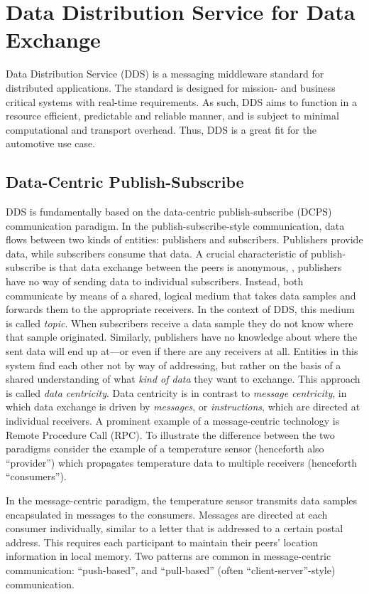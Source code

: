 \section{Data Distribution Service for Data Exchange}

Data Distribution Service (DDS) is a messaging middleware standard \cite{dds-1.4-standard} for distributed applications. The standard is designed for mission- and business critical systems with real-time requirements. As such, DDS aims to function in a resource efficient, predictable and reliable manner, and is subject to minimal computational and transport overhead.
Thus, DDS is a great fit for the automotive use case.

\subsection{Data-Centric Publish-Subscribe}
DDS is fundamentally based on the data-centric publish-subscribe (DCPS) communication paradigm. In the publish-subscribe-style communication, data flows between two kinds of entities: publishers and subscribers. Publishers provide data, while subscribers consume that data. A crucial characteristic of publish-subscribe is that data exchange between the peers is anonymous, \ie , publishers have no way of sending data to individual subscribers. Instead, both communicate by means of a shared, logical medium that takes data samples and forwards them to the appropriate receivers. In the context of DDS, this medium is called \emph{topic}. When subscribers receive a data sample they do not know where that sample originated. Similarly, publishers have no knowledge about where the sent data will end up at---or even if there are any receivers at all. Entities in this system find each other not by way of addressing, but rather on the basis of a shared understanding of what \emph{kind of data} they want to exchange. This approach is called \emph{data centricity}. Data centricity is in contrast to \emph{message centricity}, in which data exchange is driven by \emph{messages}, or \emph{instructions}, which are directed at individual receivers. A prominent example of a message-centric technology is Remote Procedure Call (RPC). To illustrate the difference between the two paradigms consider the example of a temperature sensor (henceforth also ``provider'') which propagates temperature data to multiple receivers (henceforth ``consumers''). 

In the message-centric paradigm, the temperature sensor transmits data samples encapsulated in messages to the consumers. Messages are directed at each consumer individually, similar to a letter that is addressed to a certain postal address. This requires each participant to maintain their peers' location information in local memory.  
Two patterns are common in message-centric communication: ``push-based'', and ``pull-based'' (often ``client-server''-style) communication.

